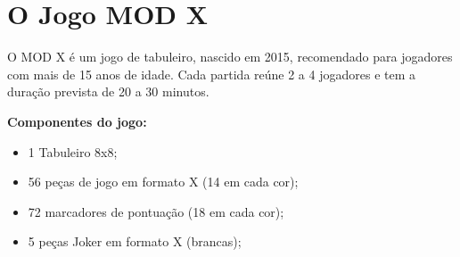 \documentclass[a4paper]{article}
\begin{document}
%
%
%
%
%
%
%


\section{O Jogo MOD X}

O MOD X é um jogo de tabuleiro, nascido em 2015, recomendado para jogadores com mais de 15 anos de idade.
Cada partida reúne 2 a 4 jogadores e tem a duração prevista de 20 a 30 minutos. 

\vspace{0.5cm}

\textbf{Componentes do jogo:}
\begin{itemize}
	\item 1 Tabuleiro 8x8;
	\item 56 peças de jogo em formato X (14 em cada cor);
	\item 72 marcadores de pontuação (18 em cada cor);
	\item 5 peças Joker em formato X (brancas);
\end{itemize}

\vspace{0.5cm}
\end{document}
